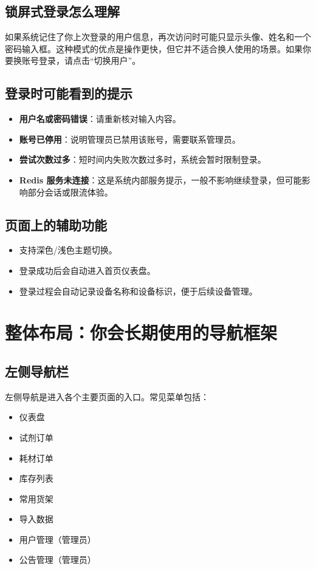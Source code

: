 \documentclass[12pt,a4paper]{ctexart}
\begin{document}
\subsection{锁屏式登录怎么理解}
如果系统记住了你上次登录的用户信息，再次访问时可能只显示头像、姓名和一个密码输入框。这种模式的优点是操作更快，但它并不适合换人使用的场景。如果你要换账号登录，请点击“切换用户”。

\subsection{登录时可能看到的提示}
\begin{itemize}
  \item \textbf{用户名或密码错误}：请重新核对输入内容。
  \item \textbf{账号已停用}：说明管理员已禁用该账号，需要联系管理员。
  \item \textbf{尝试次数过多}：短时间内失败次数过多时，系统会暂时限制登录。
  \item \textbf{Redis 服务未连接}：这是系统内部服务提示，一般不影响继续登录，但可能影响部分会话或限流体验。
\end{itemize}

\subsection{页面上的辅助功能}
\begin{itemize}
  \item 支持深色/浅色主题切换。
  \item 登录成功后会自动进入首页仪表盘。
  \item 登录过程会自动记录设备名称和设备标识，便于后续设备管理。
\end{itemize}

\newpage
\section{整体布局：你会长期使用的导航框架}

\subsection{左侧导航栏}
左侧导航是进入各个主要页面的入口。常见菜单包括：
\begin{itemize}
  \item 仪表盘
  \item 试剂订单
  \item 耗材订单
  \item 库存列表
  \item 常用货架
  \item 导入数据
  \item 用户管理（管理员）
  \item 公告管理（管理员）
\end{itemize}
\end{document}
